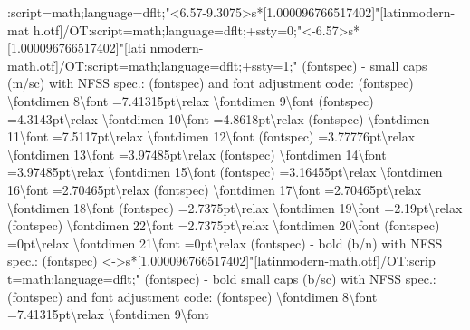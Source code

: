 \documentclass[
  letterpaper,
  DIV=11,
  numbers=noendperiod]{scrartcl}
\newenvironment{Shaded}{\begin{snugshade}}{\end{snugshade}}
\newcommand{\NormalTok}[1]{\textcolor[rgb]{0.00,0.23,0.31}{#1}}
\begin{document}
\begin{Shaded}
\begin{Highlighting}[]
\NormalTok{:script=math;language=dflt;"\textless{}6.57{-}9.3075\textgreater{}s*[1.000096766517402]"[latinmodern{-}mat}
\NormalTok{h.otf]/OT:script=math;language=dflt;+ssty=0;"\textless{}{-}6.57\textgreater{}s*[1.000096766517402]"[lati}
\NormalTok{nmodern{-}math.otf]/OT:script=math;language=dflt;+ssty=1;"}
\NormalTok{(fontspec)             {-} \textquotesingle{}small caps\textquotesingle{}  (m/sc) with NFSS spec.: }
\NormalTok{(fontspec)             and font adjustment code:}
\NormalTok{(fontspec)             \textbackslash{}fontdimen 8\textbackslash{}font =7.41315pt\textbackslash{}relax \textbackslash{}fontdimen 9\textbackslash{}font}
\NormalTok{(fontspec)             =4.3143pt\textbackslash{}relax \textbackslash{}fontdimen 10\textbackslash{}font =4.8618pt\textbackslash{}relax}
\NormalTok{(fontspec)             \textbackslash{}fontdimen 11\textbackslash{}font =7.5117pt\textbackslash{}relax \textbackslash{}fontdimen 12\textbackslash{}font}
\NormalTok{(fontspec)             =3.77776pt\textbackslash{}relax \textbackslash{}fontdimen 13\textbackslash{}font =3.97485pt\textbackslash{}relax}
\NormalTok{(fontspec)             \textbackslash{}fontdimen 14\textbackslash{}font =3.97485pt\textbackslash{}relax \textbackslash{}fontdimen 15\textbackslash{}font}
\NormalTok{(fontspec)             =3.16455pt\textbackslash{}relax \textbackslash{}fontdimen 16\textbackslash{}font =2.70465pt\textbackslash{}relax}
\NormalTok{(fontspec)             \textbackslash{}fontdimen 17\textbackslash{}font =2.70465pt\textbackslash{}relax \textbackslash{}fontdimen 18\textbackslash{}font}
\NormalTok{(fontspec)             =2.7375pt\textbackslash{}relax \textbackslash{}fontdimen 19\textbackslash{}font =2.19pt\textbackslash{}relax}
\NormalTok{(fontspec)             \textbackslash{}fontdimen 22\textbackslash{}font =2.7375pt\textbackslash{}relax \textbackslash{}fontdimen 20\textbackslash{}font}
\NormalTok{(fontspec)             =0pt\textbackslash{}relax \textbackslash{}fontdimen 21\textbackslash{}font =0pt\textbackslash{}relax }
\NormalTok{(fontspec)             {-} \textquotesingle{}bold\textquotesingle{} (b/n) with NFSS spec.:}
\NormalTok{(fontspec)             \textless{}{-}\textgreater{}s*[1.000096766517402]"[latinmodern{-}math.otf]/OT:scrip}
\NormalTok{t=math;language=dflt;"}
\NormalTok{(fontspec)             {-} \textquotesingle{}bold small caps\textquotesingle{}  (b/sc) with NFSS spec.: }
\NormalTok{(fontspec)             and font adjustment code:}
\NormalTok{(fontspec)             \textbackslash{}fontdimen 8\textbackslash{}font =7.41315pt\textbackslash{}relax \textbackslash{}fontdimen 9\textbackslash{}font}

\end{Highlighting}
\end{Shaded}
\end{document}
